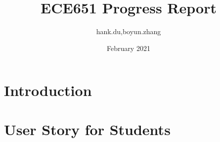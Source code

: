 \documentclass{article}
\title{ECE651 Progress Report}
\author{hank.du,boyun.zhang }
\date{February 2021}
\begin{document}
\maketitle

\section{Introduction}

\section{User Story for Students}
\end{document}
